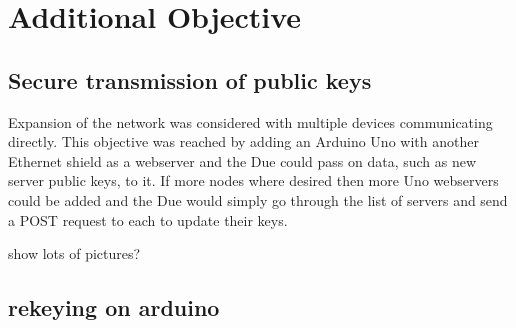 \section{Additional Objective}

\subsection{Secure transmission of public keys}

Expansion of the network was considered with multiple devices communicating directly. This objective was reached by adding an Arduino Uno with another Ethernet shield as a webserver and the Due could pass on data, such as new server public keys, to it. If more nodes where desired then more Uno webservers could be added and the Due would simply go through the list of servers and send a POST request to each to update their keys.

show lots of pictures?

\subsection{rekeying on arduino}
